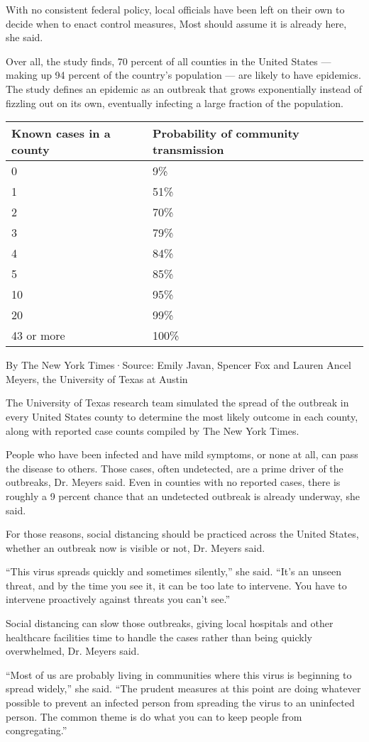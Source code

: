 With no consistent federal policy, local officials have been left on
their own to decide when to enact control measures, Most should assume
it is already here, she said.

Over all, the study finds, 70 percent of all counties in the United
States --- making up 94 percent of the country's population --- are
likely to have epidemics. The study defines an epidemic as an outbreak
that grows exponentially instead of fizzling out on its own, eventually
infecting a large fraction of the population.

\begin{longtable}[]{@{}ll@{}}
\toprule
\textbf{Known cases in a county} & \textbf{Probability of community
transmission}\tabularnewline
\midrule
\endhead
0 & 9\%\tabularnewline
1 & 51\%\tabularnewline
2 & 70\%\tabularnewline
3 & 79\%\tabularnewline
4 & 84\%\tabularnewline
5 & 85\%\tabularnewline
10 & 95\%\tabularnewline
20 & 99\%\tabularnewline
43 or more & 100\%\tabularnewline
\bottomrule
\end{longtable}

By The New York Times·Source: Emily Javan, Spencer Fox and Lauren Ancel
Meyers, the University of Texas at Austin

The University of Texas research team simulated the spread of the
outbreak in every United States county to determine the most likely
outcome in each county, along with reported case counts compiled by The
New York Times.

People who have been infected and have mild symptoms, or none at all,
can pass the disease to others. Those cases, often undetected, are a
prime driver of the outbreaks, Dr. Meyers said. Even in counties with no
reported cases, there is roughly a 9 percent chance that an undetected
outbreak is already underway, she said.

For those reasons, social distancing should be practiced across the
United States, whether an outbreak now is visible or not, Dr. Meyers
said.

``This virus spreads quickly and sometimes silently,'' she said. ``It's
an unseen threat, and by the time you see it, it can be too late to
intervene. You have to intervene proactively against threats you can't
see.''

Social distancing can slow those outbreaks, giving local hospitals and
other healthcare facilities time to handle the cases rather than being
quickly overwhelmed, Dr. Meyers said.

``Most of us are probably living in communities where this virus is
beginning to spread widely,'' she said. ``The prudent measures at this
point are doing whatever possible to prevent an infected person from
spreading the virus to an uninfected person. The common theme is do what
you can to keep people from congregating.''

